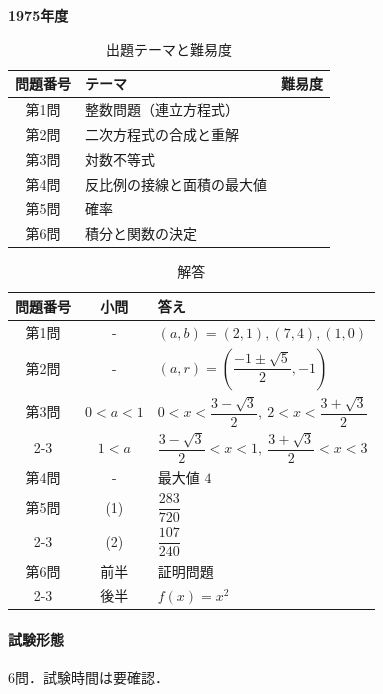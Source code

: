 \documentclass[../../main.tex]{subfiles}
\begin{document}
\begin{center}
  {\fontsize{48pt}{58pt}\selectfont \textbf{1975}\normalsize\textbf{年度}}
\end{center}

\begin{table}[htb]
  \centering
  \caption{出題テーマと難易度}
  \begin{tabular}{|c|p{9cm}|c|}
    \hline
    \textbf{問題番号} & \textbf{テーマ} & \textbf{難易度} \\
    \hline
    第1問 & 整数問題（連立方程式） & \\
    \hline
    第2問 & 二次方程式の合成と重解 & \\
    \hline
    第3問 & 対数不等式 & \\
    \hline
    第4問 & 反比例の接線と面積の最大値 & \\
    \hline
    第5問 & 確率 & \\
    \hline
    第6問 & 積分と関数の決定 & \\
    \hline
  \end{tabular}
\end{table}

\begin{table}[htb]
  \centering
  \caption{解答}
  \renewcommand{\arraystretch}{1.4}
  \begin{tabular}{|c|c|p{9cm}|}
    \hline
    \textbf{問題番号} & \textbf{小問} & \textbf{答え} \\
    \hline
    第1問 & - & $(a,b)=(2,1),(7,4),(1,0)$ \\
    \hline
    第2問 & - & $(a,r)=\left(\dfrac{-1\pm\sqrt{5}}{2},-1\right)$ \\
    \hline
    第3問 & $0<a<1$ & $0<x<\dfrac{3-\sqrt{3}}{2},\ 2<x<\dfrac{3+\sqrt{3}}{2}$ \\
    \cline{2-3}
    & $1<a$ & $\dfrac{3-\sqrt{3}}{2}<x<1,\ \dfrac{3+\sqrt{3}}{2}<x<3$ \\
    \hline
    第4問 & - & 最大値 $4$ \\
    \hline
    第5問 & (1) & $\dfrac{283}{720}$ \\
    \cline{2-3}
    & (2) & $\dfrac{107}{240}$ \\
    \hline
    第6問 & 前半 & 証明問題 \\
    \cline{2-3}
    & 後半 & $f(x)=x^2$ \\
    \hline
  \end{tabular}
\end{table}

\paragraph{試験形態}
6問．試験時間は要確認．
\end{document}

